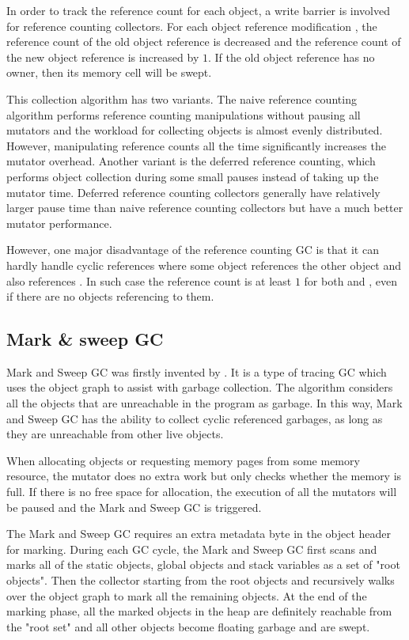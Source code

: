 In order to track the reference count for each object, a write barrier is involved
for reference counting collectors.
For each object reference modification , the reference count of
the old object reference is decreased and the reference count of the new object reference
is increased by $1$. If the old object reference has no owner, then its memory cell will be swept.

This collection algorithm has two variants. The naive reference counting algorithm
performs reference counting manipulations without pausing all mutators and the workload for collecting objects is
almost evenly distributed. However, manipulating reference counts all the time significantly increases the
mutator overhead. Another variant is the deferred reference counting, which performs object collection during some small pauses instead of taking up
the mutator time.
Deferred reference counting collectors generally have relatively larger pause time than naive reference counting collectors
but have a much better mutator performance.

However, one major disadvantage of the reference counting GC is that it can hardly
handle cyclic references \citep{lins1992cyclic} where some object  references the other object
 and  also references . In such case the reference
count is at least $1$ for both  and , even if there are no
objects referencing to them.

\subsection{Mark \& sweep GC}

Mark and Sweep GC was firstly invented by \cite{mccarthy1960recursive}.
It is a type of tracing GC which uses the object graph to assist with garbage collection.
The algorithm considers all the objects that are unreachable in the program as garbage.
In this way, Mark and Sweep GC has the ability to collect cyclic referenced garbages,
as long as they are unreachable from other live objects.


When allocating objects or requesting memory pages from some memory resource,
the mutator does no extra work but only checks whether the memory is full.
If there is no free space for allocation, the execution of all the mutators will be
paused and the Mark and Sweep GC is triggered.

The Mark and Sweep GC requires an extra metadata byte in the object header for marking.
During each GC cycle, the Mark and Sweep GC first scans and marks all of the static objects,
global objects and stack variables as a set of "root objects".
Then the collector starting from the root objects and recursively walks over the
object graph to mark all the remaining objects. At the end of the marking phase,
all the marked objects in the heap are definitely reachable from the "root set" and all other
objects become floating garbage and are swept.

